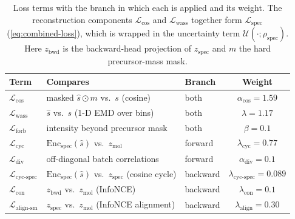 \begin{table}[H]
    \centering
    \small
    \caption[Loss Terms]{
        Loss terms with the branch in which each is applied and its weight.
        The reconstruction components $\mathcal{L}_{\cos}$ and $\mathcal{L}_{\mathrm{wass}}$ together form $\mathcal{L}_{\mathrm{spec}}$ (\cref{eq:combined-loss}), which is wrapped in the uncertainty term $\mathcal{U}(\cdot;\rho_{\mathrm{spec}})$.
        Here $z_{\mathrm{bwd}}$ is the backward-head projection of $z_{\mathrm{spec}}$ and $m$ the hard precursor-mass mask.
    }
    \label{tab:loss-terms}
    \begin{tabular}{lllc}
        \hline
        Term & Compares & Branch & Weight \\
        \hline
        $\mathcal{L}_{\cos}$            & masked $\hat{s}\odot m$ vs.\ $s$ (cosine)                       & both     & $\alpha_{\cos}=1.59$ \\
        $\mathcal{L}_{\mathrm{wass}}$   & $\hat{s}$ vs.\ $s$ (1-D EMD over bins)                          & both     & $\lambda=1.17$ \\
        $\mathcal{L}_{\mathrm{forb}}$   & intensity beyond precursor mask                                 & both     & $\beta=0.1$ \\
        $\mathcal{L}_{\mathrm{cyc}}$    & $\mathrm{Enc}_{\mathrm{spec}}(\hat{s})$ vs.\ $z_{\mathrm{mol}}$  & forward  & $\lambda_{\mathrm{cyc}}=0.77$ \\
        $\mathcal{L}_{\mathrm{div}}$    & off-diagonal batch correlations                                 & forward  & $\alpha_{\mathrm{div}}=0.1$ \\
        $\mathcal{L}_{\text{cyc-spec}}$ & $\mathrm{Enc}_{\mathrm{spec}}(\hat{s})$ vs.\ $z_{\mathrm{spec}}$ (cosine cycle) & backward & $\lambda_{\text{cyc-spec}}=0.089$ \\
        $\mathcal{L}_{\mathrm{con}}$    & $z_{\mathrm{bwd}}$ vs.\ $z_{\mathrm{mol}}$ (InfoNCE)            & backward & $\lambda_{\mathrm{con}}=0.1$ \\
        $\mathcal{L}_{\text{align-sm}}$ & $z_{\mathrm{spec}}$ vs.\ $z_{\mathrm{mol}}$ (InfoNCE alignment)  & backward & $\lambda_{\text{align}}=0.30$ \\
        \hline
    \end{tabular}
\end{table}


